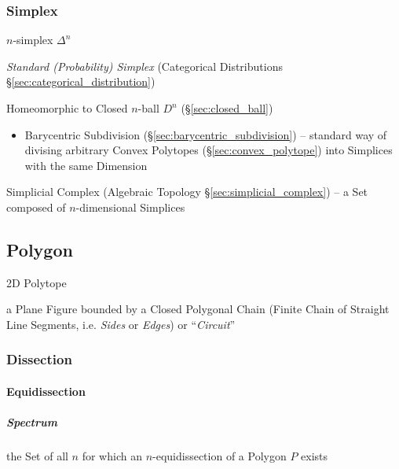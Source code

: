 \subsubsection{Simplex}\label{sec:simplex}

$n$-simplex $\Delta^n$

\emph{Standard (Probability) Simplex} (Categorical Distributions
\S\ref{sec:categorical_distribution})

Homeomorphic to Closed $n$-ball $D^n$ (\S\ref{sec:closed_ball})

\begin{itemize}
  \item Barycentric Subdivision (\S\ref{sec:barycentric_subdivision}) --
    standard way of divising arbitrary Convex Polytopes
    (\S\ref{sec:convex_polytope}) into Simplices with the same Dimension
\end{itemize}

\fist Simplicial Complex (Algebraic Topology \S\ref{sec:simplicial_complex}) --
a Set composed of $n$-dimensional Simplices



\subsection{Polygon}\label{sec:polygon}

2D Polytope

a Plane Figure bounded by a Closed Polygonal Chain (Finite Chain of Straight
Line Segments, i.e. \emph{Sides} or \emph{Edges}) or ``\emph{Circuit}''



\subsubsection{Dissection}\label{sec:dissection}

\paragraph{Equidissection}\label{sec:equidissection}\hfill

\subparagraph{Spectrum}\label{sec:polygon_spectrum}\hfill

the Set of all $n$ for which an $n$-equidissection of a Polygon $P$ exists



